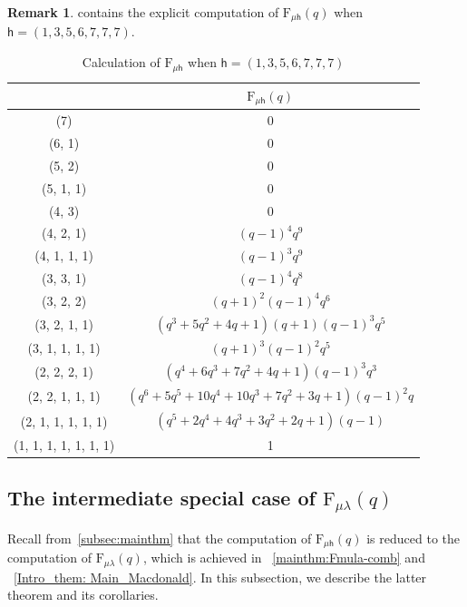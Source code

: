 \documentclass[12pt,a4paper,reqno]{amsart}
\theoremstyle{plain}
\theoremstyle{definition}
\newtheorem{remark}[theorem]{Remark}
\newcommand{\1}{\mathds{1}}
\newcommand{\F}{\mathrm{F}}
\newcommand{\hes}{\mathsf{h}}
\begin{document}
\begin{remark}  contains the explicit computation of $\F_{\mu\hes}(q)$ when $\hes = (1,3,5,6,7,7,7)$.
\begin{table}[h!]\scriptsize
\renewcommand{\arraystretch}{1.5} %
\centering
\renewcommand{\arraystretch}{1.5} %
\centering
\begin{tabular}{|c|c|}
\hline
\text{$\mu$} & $\F_{\mu\hes}(q)$ \\
\hline
(7) & 0 \\
\hline
(6, 1) & 0 \\
\hline
(5, 2) & 0 \\
\hline
(5, 1, 1) & 0 \\
\hline
(4, 3) & 0 \\
\hline
(4, 2, 1) & $(q - 1)^4 q^9$ \\
\hline
(4, 1, 1, 1) & $(q - 1)^3 q^9$ \\
\hline
(3, 3, 1) & $(q - 1)^4 q^8$ \\
\hline
(3, 2, 2) & $(q + 1)^2 (q - 1)^4 q^6$ \\
\hline
(3, 2, 1, 1) & $(q^3 + 5q^2 + 4q + 1)(q + 1)(q - 1)^3 q^5$ \\
\hline
(3, 1, 1, 1, 1) & $(q + 1)^3 (q - 1)^2 q^5$ \\
\hline
(2, 2, 2, 1) & $(q^4 + 6q^3 + 7q^2 + 4q + 1)(q - 1)^3 q^3$ \\
\hline
(2, 2, 1, 1, 1) & $(q^6 + 5q^5 + 10q^4 + 10q^3 + 7q^2 + 3q + 1)(q - 1)^2 q$ \\
\hline
(2, 1, 1, 1, 1, 1) & $(q^5 + 2q^4 + 4q^3 + 3q^2 + 2q + 1)(q - 1)$ \\
\hline
(1, 1, 1, 1, 1, 1, 1) & 1 \\
\hline
\end{tabular}
    \caption{\small Calculation of $\F_{\mu\hes}$ when $\hes=(1,3,5,6,7,7,7)$}
    \label{Table1}
\end{table}
\end{remark}


\subsection{The intermediate special case of $\F_{\mu\lambda}(q)$}
Recall from~\cref{subsec:mainthm} that the computation of $\F_{\mu\hes}(q)$ is reduced to the computation of $\F_{\mu\lambda}(q)$, which is achieved in ~\cref{mainthm:Fmula-comb} and ~\cref{Intro_them: Main_Macdonald}. In this subsection, we describe the latter theorem and its corollaries. 
\end{document}
